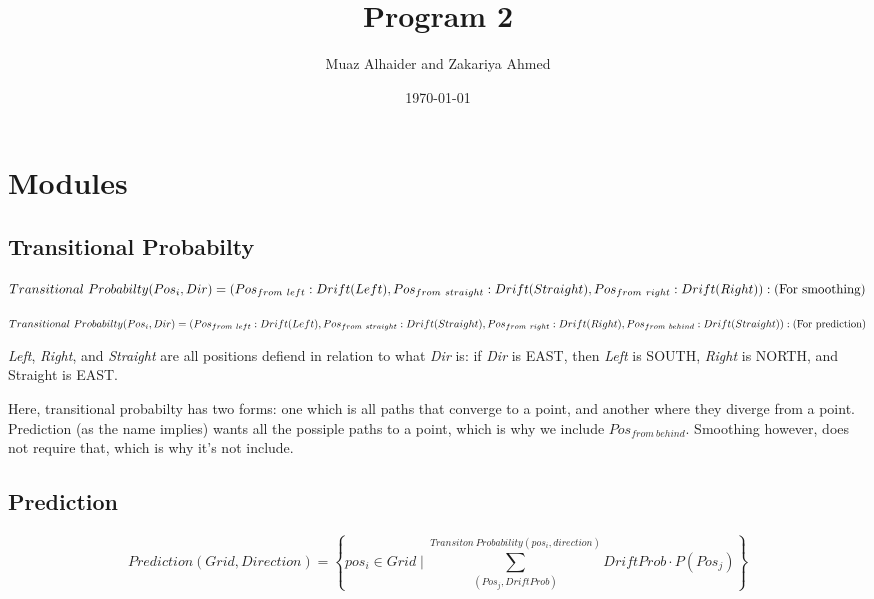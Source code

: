 \documentclass[11pt]{article}
\author{Muaz Alhaider and Zakariya Ahmed}
\date{\today}
\title{Program 2}
\begin{document}
\maketitle
\tableofcontents


\section{Modules}
\label{sec:org337da2e}

\subsection{Transitional Probabilty}
\label{sec:org561e420}
   \begin{math}
    Transitional\ Probabilty(Pos_i, Dir) = \\
     (Pos_{from\ left}:Drift(Left), Pos_{from\ straight}:Drift(Straight), Pos_{from\ right}:Drift(Right)): (\text{For smoothing})
\end{math}

\newline 
\begin{math}
\\ \\
Transitional\ Probabilty(Pos_i, Dir) =\\ (Pos_{from\ left}:Drift(Left), Pos_{from\ straight}:Drift(Straight), Pos_{from\ right}:Drift(Right), Pos_{from\ behind}:Drift(Straight)): (\text{For prediction})
\\ \\
\end{math}


\emph{Left}, \emph{Right}, and \emph{Straight} are all positions defiend in relation to what \emph{Dir} is: if \emph{Dir} is EAST, then \emph{Left} is SOUTH, \emph{Right} is NORTH, and Straight is EAST.

Here, transitional probabilty has two forms: one which is all paths that converge to a point, and another where they diverge from a point. Prediction (as the name implies) wants all the possiple paths to a point, which is why we include \(Pos_{from\ behind}\). Smoothing however, does not require that, which is why it's not include.


\subsection{Prediction}
\label{sec:orga352dc6}
$$Prediction(Grid, Direction) = \left\{pos_i \in Grid \mid \sum^{Transiton\ Probability(pos_i, direction)}_{(Pos_j, DriftProb)} DriftProb \cdot P(Pos_j) \right \}$$
\end{document}
